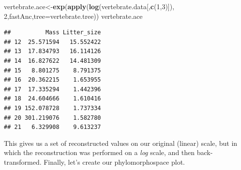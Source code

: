\documentclass[fleqn,10pt,lineno]{wlpeerj} %
\newenvironment{Shaded}{\begin{snugshade}}{\end{snugshade}}
\newcommand{\AttributeTok}[1]{\textcolor[rgb]{0.13,0.29,0.53}{#1}}
\newcommand{\DecValTok}[1]{\textcolor[rgb]{0.00,0.00,0.81}{#1}}
\newcommand{\FunctionTok}[1]{\textcolor[rgb]{0.13,0.29,0.53}{\textbf{#1}}}
\newcommand{\NormalTok}[1]{#1}
\newcommand{\OtherTok}[1]{\textcolor[rgb]{0.56,0.35,0.01}{#1}}
\begin{document}
\begin{Shaded}
\begin{Highlighting}[]
\NormalTok{vertebrate.ace}\OtherTok{\textless{}{-}}\FunctionTok{exp}\NormalTok{(}\FunctionTok{apply}\NormalTok{(}\FunctionTok{log}\NormalTok{(vertebrate.data[,}\FunctionTok{c}\NormalTok{(}\DecValTok{1}\NormalTok{,}\DecValTok{3}\NormalTok{)]),}
  \DecValTok{2}\NormalTok{,fastAnc,}\AttributeTok{tree=}\NormalTok{vertebrate.tree))}
\NormalTok{vertebrate.ace}
\end{Highlighting}
\end{Shaded}

\begin{verbatim}
##          Mass Litter_size
## 12  25.571594   15.552422
## 13  17.834793   16.114126
## 14  16.827622   14.481309
## 15   8.801275    8.791375
## 16  20.362215    1.653955
## 17  17.335294    1.442396
## 18  24.604666    1.610416
## 19 152.078728    1.737334
## 20 301.219076    1.582780
## 21   6.329908    9.613237
\end{verbatim}

This gives us a set of reconstructed values on our original (linear) scale, but in which the reconstruction was performed on a \emph{log} scale, and then back-transformed. Finally, let's create our phylomorphospace plot.
\end{document}
